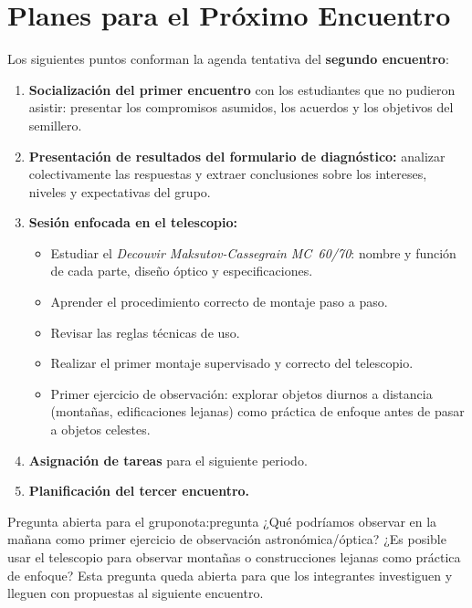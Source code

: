 \section{Planes para el Próximo Encuentro}

Los siguientes puntos conforman la agenda tentativa del \textbf{segundo encuentro}:

\begin{enumerate}[leftmargin=1.5em, label=\arabic*.]
    \item \textbf{Socialización del primer encuentro} con los estudiantes que no
          pudieron asistir: presentar los compromisos asumidos, los acuerdos y los
          objetivos del semillero.
    \item \textbf{Presentación de resultados del formulario de diagnóstico:} analizar
          colectivamente las respuestas y extraer conclusiones sobre los intereses,
          niveles y expectativas del grupo.
    \item \textbf{Sesión enfocada en el telescopio:}
        \begin{itemize}
            \item Estudiar el \textit{Decouvir Maksutov-Cassegrain MC~60/70}:
                  nombre y función de cada parte, diseño óptico y especificaciones.
            \item Aprender el procedimiento correcto de montaje paso a paso.
            \item Revisar las reglas técnicas de uso.
            \item Realizar el primer montaje supervisado y correcto del telescopio.
            \item Primer ejercicio de observación: explorar objetos diurnos a distancia
                  (montañas, edificaciones lejanas) como práctica de enfoque antes de
                  pasar a objetos celestes.
        \end{itemize}
    \item \textbf{Asignación de tareas} para el siguiente periodo.
    \item \textbf{Planificación del tercer encuentro.}
\end{enumerate}

\begin{nota}{Pregunta abierta para el grupo}{nota:pregunta}
    ¿Qué podríamos observar en la mañana como primer ejercicio de observación
    astronómica/óptica? ¿Es posible usar el telescopio para observar montañas
    o construcciones lejanas como práctica de enfoque? Esta pregunta queda
    abierta para que los integrantes investiguen y lleguen con propuestas al
    siguiente encuentro.
\end{nota}
